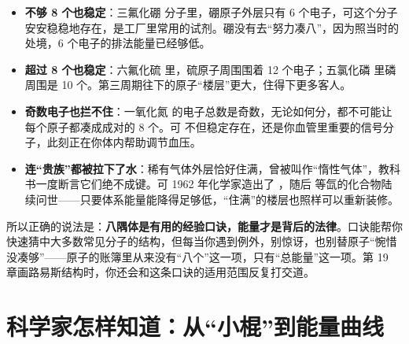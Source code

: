 \begin{itemize}[itemsep=2pt]
\item \textbf{不够 8 个也稳定}：三氟化硼  分子里，硼原子外层只有 6 个电子，可这个分子安安稳稳地存在，是工厂里常用的试剂。硼没有去“努力凑八”，因为照当时的处境，6 个电子的排法能量已经够低。
\item \textbf{超过 8 个也稳定}：六氟化硫  里，硫原子周围围着 12 个电子；五氯化磷  里磷周围是 10 个。第三周期往下的原子“楼层”更大，住得下更多客人。
\item \textbf{奇数电子也拦不住}：一氧化氮  的电子总数是奇数，无论如何分，都不可能让每个原子都凑成成对的 8 个。可  不但稳定存在，还是你血管里重要的信号分子，此刻正在你体内帮助调节血压。
\item \textbf{连“贵族”都被拉下了水}：稀有气体外层恰好住满，曾被叫作“惰性气体”，教科书一度断言它们绝不成键。可 1962 年化学家造出了 ，随后  等氙的化合物陆续问世——只要体系能量能降得足够低，“住满”的楼层也照样可以重新装修。
\end{itemize}

所以正确的说法是：\textbf{八隅体是有用的经验口诀，能量才是背后的法律}。口诀能帮你快速猜中大多数常见分子的结构，但每当你遇到例外，别惊讶，也别替原子“惋惜没凑够”——原子的账簿里从来没有“八个”这一项，只有“总能量”这一项。第 19 章画路易斯结构时，你还会和这条口诀的适用范围反复打交道。

\section{科学家怎样知道：从“小棍”到能量曲线}

